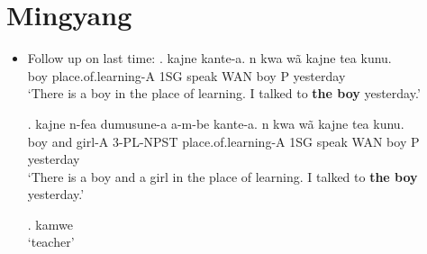 \documentclass{assets/fieldnotes}
\begin{document}
\section{Mingyang}

\begin{itemize}
    \item Follow up on last time: 
    \exg. kajne kante-a. n kwa wã kajne tea kunu.\\
   boy place.of.learning-A 1SG speak WAN boy P yesterday\\
   `There is a boy in the place of learning. I talked to \textbf{the boy} yesterday.'

    \exg. kajne n-fea dumusune-a a-m-be kante-a. n kwa wã kajne tea kunu.\\
    boy and girl-A 3-PL-NPST place.of.learning-A 1SG speak WAN boy P yesterday\\
   `There is a boy and a girl in the place of learning. I talked to \textbf{the boy} yesterday.'

    \ex. kamwe\\
        `teacher'


\end{itemize}
\end{document}
